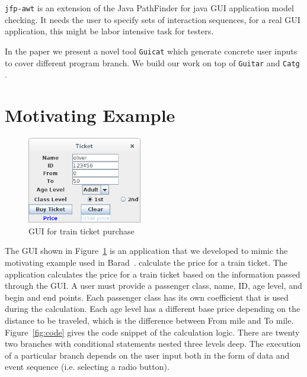 \documentclass[blind]{sig-alternate-05-2015}
\begin{document}
\texttt{jfp-awt} \cite{jpfawt} is an extension of the Java PathFinder for java GUI application model checking. It needs the user to specify sets of interaction sequences, for a real GUI application, this might be labor intensive task for testers.

In the paper we present a novel tool \texttt{Guicat} which generate concrete user inputs to cover different program branch. We build our work on top of \texttt{Guitar} and \texttt{Catg} \cite{catg}.




\section{Motivating Example}

\begin{figure}
\label{fig:ex}
  \centering
  \includegraphics[width=50mm,scale=0.5]{./res/ticket.png}
  \caption{GUI for train ticket purchase}
\end{figure}

The GUI shown in Figure~\ref{fig:ex} is an application that we developed to mimic the motivating example used in Barad~\cite{}. calculate the price for a train ticket. The application calculates the price for a train ticket based on the information passed through the GUI. A user must provide a passenger class, name, ID, age level, and begin
and end points. Each passenger class has its own coefficient that is used during the calculation. Each age level has a different
base price depending on the distance to be traveled,
which is the difference between From mile and To mile. Figure~\ref{fig:code} gives the code snippet of the calculation logic.  There are twenty two branches with conditional statements nested three levels deep. The
execution of a particular branch depends on the user
input both in the form of data and event sequence (i.e.
selecting a radio button).
\end{document}
